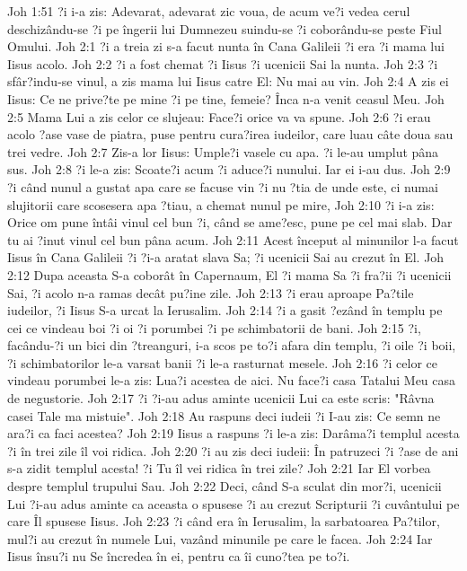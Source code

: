 Joh 1:51  ?i i-a zis: Adevarat, adevarat zic voua, de acum ve?i vedea cerul deschizându-se ?i pe îngerii lui Dumnezeu suindu-se ?i coborându-se peste Fiul Omului.
Joh 2:1  ?i a treia zi s-a facut nunta în Cana Galileii ?i era ?i mama lui Iisus acolo.
Joh 2:2  ?i a fost chemat ?i Iisus ?i ucenicii Sai la nunta.
Joh 2:3  ?i sfâr?indu-se vinul, a zis mama lui Iisus catre El: Nu mai au vin.
Joh 2:4  A zis ei Iisus: Ce ne prive?te pe mine ?i pe tine, femeie? Înca n-a venit ceasul Meu.
Joh 2:5  Mama Lui a zis celor ce slujeau: Face?i orice va va spune.
Joh 2:6  ?i erau acolo ?ase vase de piatra, puse pentru cura?irea iudeilor, care luau câte doua sau trei vedre.
Joh 2:7  Zis-a lor Iisus: Umple?i vasele cu apa. ?i le-au umplut pâna sus.
Joh 2:8  ?i le-a zis: Scoate?i acum ?i aduce?i nunului. Iar ei i-au dus.
Joh 2:9  ?i când nunul a gustat apa care se facuse vin ?i nu ?tia de unde este, ci numai slujitorii care scosesera apa ?tiau, a chemat nunul pe mire,
Joh 2:10  ?i i-a zis: Orice om pune întâi vinul cel bun ?i, când se ame?esc, pune pe cel mai slab. Dar tu ai ?inut vinul cel bun pâna acum.
Joh 2:11  Acest început al minunilor l-a facut Iisus în Cana Galileii ?i ?i-a aratat slava Sa; ?i ucenicii Sai au crezut în El.
Joh 2:12  Dupa aceasta S-a coborât în Capernaum, El ?i mama Sa ?i fra?ii ?i ucenicii Sai, ?i acolo n-a ramas decât pu?ine zile.
Joh 2:13  ?i erau aproape Pa?tile iudeilor, ?i Iisus S-a urcat la Ierusalim.
Joh 2:14  ?i a gasit ?ezând în templu pe cei ce vindeau boi ?i oi ?i porumbei ?i pe schimbatorii de bani.
Joh 2:15  ?i, facându-?i un bici din ?treanguri, i-a scos pe to?i afara din templu, ?i oile ?i boii, ?i schimbatorilor le-a varsat banii ?i le-a rasturnat mesele.
Joh 2:16  ?i celor ce vindeau porumbei le-a zis: Lua?i acestea de aici. Nu face?i casa Tatalui Meu casa de negustorie.
Joh 2:17  ?i ?i-au adus aminte ucenicii Lui ca este scris: "Râvna casei Tale ma mistuie".
Joh 2:18  Au raspuns deci iudeii ?i I-au zis: Ce semn ne ara?i ca faci acestea?
Joh 2:19  Iisus a raspuns ?i le-a zis: Darâma?i templul acesta ?i în trei zile îl voi ridica.
Joh 2:20  ?i au zis deci iudeii: În patruzeci ?i ?ase de ani s-a zidit templul acesta! ?i Tu îl vei ridica în trei zile?
Joh 2:21  Iar El vorbea despre templul trupului Sau.
Joh 2:22  Deci, când S-a sculat din mor?i, ucenicii Lui ?i-au adus aminte ca aceasta o spusese ?i au crezut Scripturii ?i cuvântului pe care Îl spusese Iisus.
Joh 2:23  ?i când era în Ierusalim, la sarbatoarea Pa?tilor, mul?i au crezut în numele Lui, vazând minunile pe care le facea.
Joh 2:24  Iar Iisus însu?i nu Se încredea în ei, pentru ca îi cuno?tea pe to?i.

